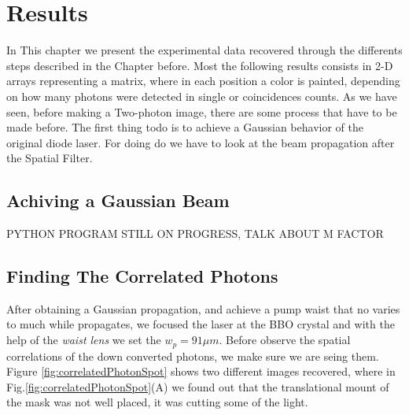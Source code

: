 
\chapter{Results} %

\label{Chapter4} %

In This chapter we present the experimental data recovered through the differents 
steps described in the Chapter before. Most the following results consists in 
2-D arrays representing a matrix, where in each position a color is painted, depending
on how many photons were detected in single or coincidences counts.
As we have seen, before making a Two-photon image, there are some process 
that have to be made before. The first thing todo is to achieve a Gaussian behavior 
of the original diode laser. For doing do we have to look at the beam propagation after 
the Spatial Filter. 

\section{Achiving a Gaussian Beam}

PYTHON PROGRAM STILL ON PROGRESS, TALK ABOUT M FACTOR

\section{Finding The Correlated Photons}

After obtaining a Gaussian propagation, and achieve a pump waist that no varies to much
while propagates, we focused the laser at the BBO crystal and with the help of the \textit{waist lens}
we set the $w_p=91 \mu m$. Before observe the spatial correlations of the down converted
photons, we make sure we are seing them. Figure \ref{fig:correlatedPhotonSpot} shows 
two different images recovered, where in Fig.\ref{fig:correlatedPhotonSpot}(A) we found
out that the translational mount of the mask was not well placed, it was cutting some of the light.


